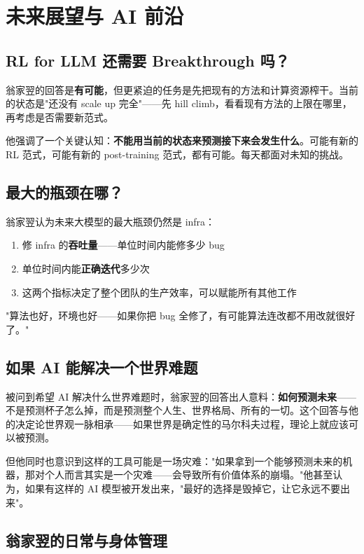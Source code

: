 \section{未来展望与 AI 前沿}

\subsection{RL for LLM 还需要 Breakthrough 吗？}

翁家翌的回答是\textbf{有可能}，但更紧迫的任务是先把现有的方法和计算资源榨干。当前的状态是"还没有 scale up 完全"——先 hill climb，看看现有方法的上限在哪里，再考虑是否需要新范式。

他强调了一个关键认知：\textbf{不能用当前的状态来预测接下来会发生什么}。可能有新的 RL 范式，可能有新的 post-training 范式，都有可能。每天都面对未知的挑战。

\subsection{最大的瓶颈在哪？}

翁家翌认为未来大模型的最大瓶颈仍然是 infra：

\begin{enumerate}
    \item 修 infra 的\textbf{吞吐量}——单位时间内能修多少 bug
    \item 单位时间内能\textbf{正确迭代}多少次
    \item 这两个指标决定了整个团队的生产效率，可以赋能所有其他工作
\end{enumerate}

"算法也好，环境也好——如果你把 bug 全修了，有可能算法连改都不用改就很好了。"

\subsection{如果 AI 能解决一个世界难题}

被问到希望 AI 解决什么世界难题时，翁家翌的回答出人意料：\textbf{如何预测未来}——不是预测杯子怎么掉，而是预测整个人生、世界格局、所有的一切。这个回答与他的决定论世界观一脉相承——如果世界是确定性的马尔科夫过程，理论上就应该可以被预测。

但他同时也意识到这样的工具可能是一场灾难："如果拿到一个能够预测未来的机器，那对个人而言其实是一个灾难——会导致所有价值体系的崩塌。"他甚至认为，如果有这样的 AI 模型被开发出来，"最好的选择是毁掉它，让它永远不要出来"。

\subsection{翁家翌的日常与身体管理}


